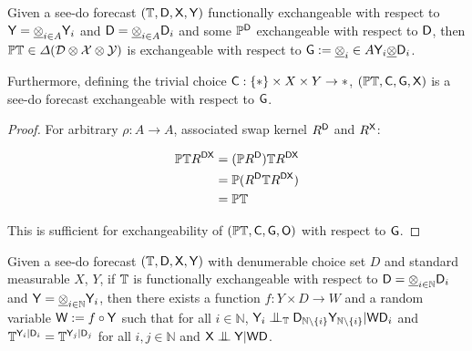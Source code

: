 \begin{lemma}\label{lem:f-ex2ex}
Given a see-do forecast $(\mathbb{T},\mathsf{D},\mathsf{X},\mathsf{Y})$ functionally exchangeable with respect to $\mathsf{Y}=\underline{\otimes}_{i\in A} \mathsf{Y}_i$ and $\mathsf{D}=\underline{\otimes}_{i\in A}\mathsf{D}_i$ and some $\mathbb{P}^{\mathsf{D}}$ exchangeable with respect to $\mathsf{D}$, then $\mathbb{P}\mathbb{T}\in \Delta(\mathcal{D}\otimes\mathcal{X}\otimes\mathcal{Y})$ is exchangeable with respect to $\mathsf{G}:=\underline{\otimes}_i\in A \mathsf{Y}_i\underline{\otimes}\mathsf{D}_i$. 

Furthermore, defining the trivial choice $\mathsf{C}:\{*\}\times X\times Y\to *$, $(\mathbb{P}\mathbb{T},\mathsf{C},\mathsf{G},\mathsf{X})$ is a see-do forecast exchangeable with respect to $\mathsf{G}$.
\end{lemma}

\begin{proof}

For arbitrary $\rho:A\to A$, associated swap kernel $R^{\mathsf{D}}$ and $R^{\mathsf{X}}$:

\begin{align}
    \mathbb{P}\mathbb{T} R^{\mathsf{D}\mathsf{X}} &= (\mathbb{P} R^{\mathsf{D}}) \mathbb{T} R^{\mathsf{D}\mathsf{X}}\\
                                  &= \mathbb{P}(R^{\mathsf{D}}\mathbb{T}R^{\mathsf{D}\mathsf{X}})\\
                                  &= \mathbb{P}\mathbb{T}
\end{align}

This is sufficient for exchangeability of $(\mathbb{P}\mathbb{T},\mathsf{C},\mathsf{G},\mathsf{O})$ with respect to $\mathsf{G}$.
\end{proof}

\begin{lemma}\label{lem:rep_fex_sdf}
Given a see-do forecast $(\mathbb{T},\mathsf{D},\mathsf{X},\mathsf{Y})$ with denumerable choice set $D$ and standard measurable $X$, $Y$, if $\mathbb{T}$ is functionally exchangeable with respect to $\mathsf{D}=\underline{\otimes}_{i\in \mathbb{N}}\mathsf{D}_i$ and $\mathsf{Y}=\underline{\otimes}_{i\in \mathbb{N}} \mathsf{Y}_i$, then there exists a function $f:Y\times D\to W$ and a random variable $\mathsf{W}:=f\circ \mathsf{Y}$ such that for all $i\in \mathbb{N}$, $\RV{Y}_i\CI_{\kernel{T}}\RV{D}_{\mathbb{N}\setminus\{i\}}\RV{Y}_{\mathbb{N}\setminus \{i\}}|\RV{W}\RV{D}_i$ and $\mathbb{T}^{\mathsf{Y}_i|\mathsf{D}_i}=\mathbb{T}^{\mathsf{Y}_j|\mathsf{D}_j}$ for all $i,j\in \mathbb{N}$ and $\RV{X}\CI\RV{Y}|\RV{W}\RV{D}$.

\end{lemma}

